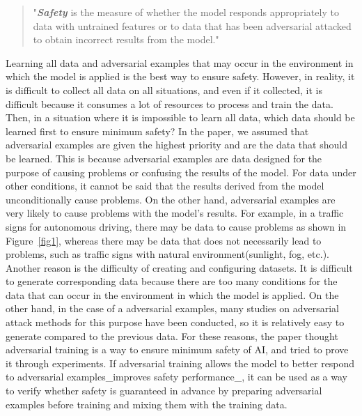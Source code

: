 \documentclass[journal,article,submit,moreauthors,pdftex]{Definitions/mdpi}
\begin{document}
\begin{quote}
    "\textit{\textbf{Safety}} is the measure of whether the model responds appropriately to data with untrained features or to data that has been adversarial attacked to obtain incorrect results from the model."
\end{quote}

Learning all data and adversarial examples that may occur in the environment in which the model is applied is the best way to ensure safety.
However, in reality, it is difficult to collect all data on all situations, and even if it collected, it is difficult because it consumes a lot of resources to process and train the data.
Then, in a situation where it is impossible to learn all data, which data should be learned first to ensure minimum safety?
In the paper, we assumed that adversarial examples are given the highest priority and are the data that should be learned.
This is because adversarial examples are data designed for the purpose of causing problems or confusing the results of the model.
For data under other conditions, it cannot be said that the results derived from the model unconditionally cause problems.
On the other hand, adversarial examples are very likely to cause problems with the model's results.
For example, in a traffic signs for autonomous driving, there may be data to cause problems as shown in Figure~\ref{fig1}, whereas there may be data that does not necessarily lead to problems, such as traffic signs with natural environment(sunlight, fog, etc.).
Another reason is the difficulty of creating and configuring datasets. It is difficult to generate corresponding data because there are too many conditions for the data that can occur in the environment in which the model is applied.
On the other hand, in the case of a adversarial examples, many studies on adversarial attack methods for this purpose have been conducted, so it is relatively easy to generate compared to the previous data.
For these reasons, the paper thought adversarial training is a way to ensure minimum safety of AI, and tried to prove it through experiments.
If adversarial training allows the model to better respond to adversarial examples\_improves safety performance\_, it can be used as a way to verify whether safety is guaranteed in advance by preparing adversarial examples before training and mixing them with the training data. \\
\end{document}
